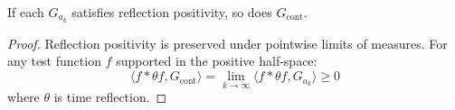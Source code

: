\begin{proposition}
If each $G_{a_k}$ satisfies reflection positivity, so does $G_{\text{cont}}$.
\end{proposition}

\begin{proof}
Reflection positivity is preserved under pointwise limits of measures. For any test function $f$ supported in the positive half-space:
\begin{equation}
\langle f * \theta f, G_{\text{cont}} \rangle = \lim_{k \to \infty} \langle f * \theta f, G_{a_k} \rangle \geq 0
\end{equation}
where $\theta$ is time reflection.
\end{proof} 